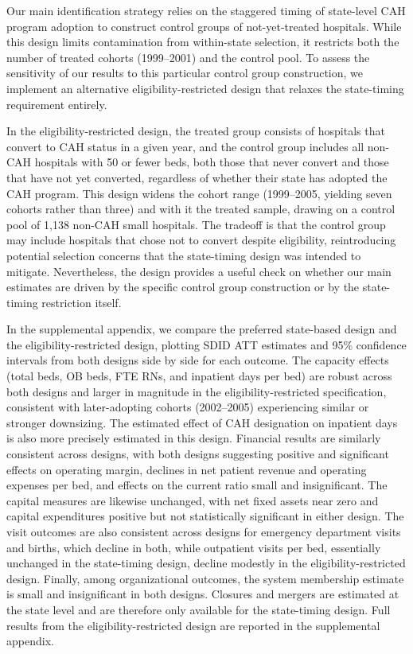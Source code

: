 \documentclass[a4paper, 12pt, twoside]{article}
\begin{document}
Our main identification strategy relies on the staggered timing of state-level CAH program adoption to construct control groups of not-yet-treated hospitals. While this design limits contamination from within-state selection, it restricts both the number of treated cohorts (1999--2001) and the control pool. To assess the sensitivity of our results to this particular control group construction, we implement an alternative eligibility-restricted design that relaxes the state-timing requirement entirely.

In the eligibility-restricted design, the treated group consists of hospitals that convert to CAH status in a given year, and the control group includes all non-CAH hospitals with 50 or fewer beds, both those that never convert and those that have not yet converted, regardless of whether their state has adopted the CAH program. This design widens the cohort range (1999--2005, yielding seven cohorts rather than three) and with it the treated sample, drawing on a control pool of 1,138 non-CAH small hospitals. The tradeoff is that the control group may include hospitals that chose not to convert despite eligibility, reintroducing potential selection concerns that the state-timing design was intended to mitigate. Nevertheless, the design provides a useful check on whether our main estimates are driven by the specific control group construction or by the state-timing restriction itself.

In the supplemental appendix, we compare the preferred state-based design and the eligibility-restricted design, plotting SDID ATT estimates and 95\% confidence intervals from both designs side by side for each outcome. The capacity effects (total beds, OB beds, FTE RNs, and inpatient days per bed) are robust across both designs and larger in magnitude in the eligibility-restricted specification, consistent with later-adopting cohorts (2002--2005) experiencing similar or stronger downsizing. The estimated effect of CAH designation on inpatient days is also more precisely estimated in this design. Financial results are similarly consistent across designs, with both designs suggesting positive and significant effects on operating margin, declines in net patient revenue and operating expenses per bed, and effects on the current ratio small and insignificant. The capital measures are likewise unchanged, with net fixed assets near zero and capital expenditures positive but not statistically significant in either design. The visit outcomes are also consistent across designs for emergency department visits and births, which decline in both, while outpatient visits per bed, essentially unchanged in the state-timing design, decline modestly in the eligibility-restricted design. Finally, among organizational outcomes, the system membership estimate is small and insignificant in both designs. Closures and mergers are estimated at the state level and are therefore only available for the state-timing design. Full results from the eligibility-restricted design are reported in the supplemental appendix.
\end{document}
